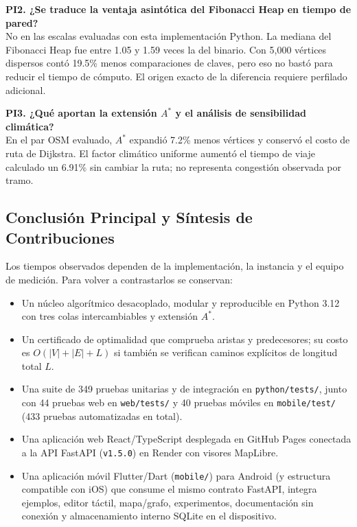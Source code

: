 \noindent\textbf{PI2. ¿Se traduce la ventaja asintótica del Fibonacci Heap en tiempo de pared?}\\[0.15cm]
No en las escalas evaluadas con esta implementación Python. La mediana del Fibonacci Heap fue entre 1.05 y 1.59 veces la del binario. Con 5,000 vértices dispersos contó 19.5\% menos comparaciones de claves, pero eso no bastó para reducir el tiempo de cómputo. El origen exacto de la diferencia requiere perfilado adicional.

\noindent\textbf{PI3. ¿Qué aportan la extensión $A^*$ y el análisis de sensibilidad climática?}\\[0.15cm]
En el par OSM evaluado, $A^*$ expandió 7.2\% menos vértices y conservó el costo de ruta de Dijkstra. El factor climático uniforme aumentó el tiempo de viaje calculado un 6.91\% sin cambiar la ruta; no representa congestión observada por tramo.

\subsection*{Conclusión Principal y Síntesis de Contribuciones}
Los tiempos observados dependen de la implementación, la instancia y el equipo de medición. Para volver a contrastarlos se conservan:
\begin{itemize}
    \item Un núcleo algorítmico desacoplado, modular y reproducible en Python 3.12 con tres colas intercambiables y extensión $A^*$.
    \item Un certificado de optimalidad que comprueba aristas y predecesores; su costo es $O(|V|+|E|+L)$ si también se verifican caminos explícitos de longitud total $L$.
    \item Una suite de 349 pruebas unitarias y de integración en \texttt{python/tests/}, junto con 44 pruebas web en \texttt{web/tests/} y 40 pruebas móviles en \texttt{mobile/test/} (433 pruebas automatizadas en total).
    \item Una aplicación web React/TypeScript desplegada en GitHub Pages conectada a la API FastAPI (\texttt{v1.5.0}) en Render con visores MapLibre.
    \item Una aplicación móvil Flutter/Dart (\texttt{mobile/}) para Android (y estructura compatible con iOS) que consume el mismo contrato FastAPI, integra ejemplos, editor táctil, mapa/grafo, experimentos, documentación sin conexión y almacenamiento interno SQLite en el dispositivo.
\end{itemize}

